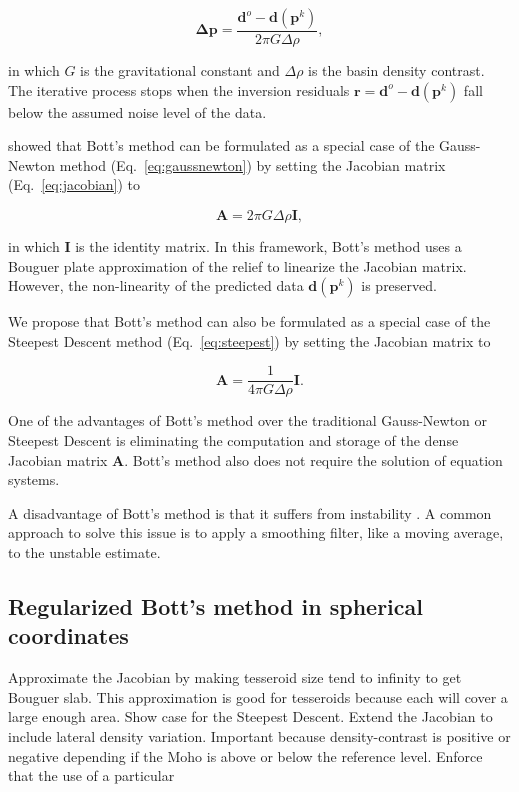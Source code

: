 \documentclass[extra,mreferee]{gji}
\begin{document}
\begin{equation}
    \mathbf{\Delta p} = \dfrac{\mathbf{d}^o - \mathbf{d}(\mathbf{p}^k)}{2\pi G \Delta \rho},
    \label{eq:bott}
\end{equation}

\noindent
in which $G$ is the gravitational constant and $\Delta \rho$ is the basin
density contrast.
The iterative process stops when the inversion residuals
$\mathbf{r} = \mathbf{d}^o - \mathbf{d}(\mathbf{p}^k)$ fall below the assumed noise level
of the data.

\citet{silva2014} showed that Bott's method can be formulated as
a special case of the Gauss-Newton method (Eq.~\ref{eq:gaussnewton})
by setting the Jacobian matrix (Eq.~\ref{eq:jacobian}) to

\begin{equation}
    \mathbf{A} = 2\pi G \Delta \rho \mathbf{I},
    \label{eq:bott-jacobian}
\end{equation}

\noindent
in which $\mathbf{I}$ is the identity matrix.
In this framework,
Bott's method uses a Bouguer plate approximation of the relief to
linearize the Jacobian matrix.
However, the non-linearity of the predicted data $\mathbf{d}(\mathbf{p}^k)$ is
preserved.

We propose that Bott's method can also be formulated as a special case of the
Steepest Descent method (Eq.~\ref{eq:steepest}) by setting the Jacobian matrix to

\begin{equation}
    \mathbf{A} = \dfrac{1}{4 \pi G \Delta \rho}\mathbf{I}.
    \label{eq:bott-steepest}
\end{equation}

One of the advantages of Bott's method over the traditional Gauss-Newton or
Steepest Descent is eliminating the computation and storage of the dense
Jacobian matrix $\mathbf{A}$.
Bott's method also does not require the solution of equation systems.

A disadvantage of Bott's method is that it suffers from instability
\citep{silva2014}.
A common approach to solve this issue is to apply a smoothing filter, like a
moving average, to the unstable estimate.


\subsection{Regularized Bott's method in spherical coordinates}

Approximate the Jacobian by making tesseroid size tend to infinity to get
Bouguer slab.
This approximation is good for tesseroids because each will cover a large
enough area.
Show case for the Steepest Descent.
Extend the Jacobian to include lateral density variation.
Important because density-contrast is positive or negative depending if the
Moho is above or below the reference level.
Enforce that the use of a particular
\end{document}
